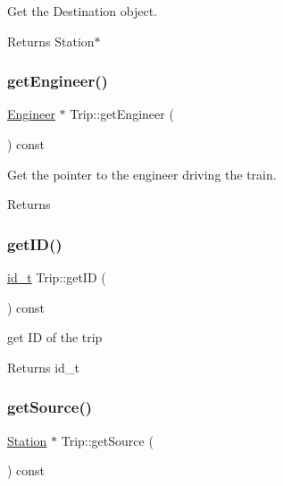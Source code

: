 Get the Destination object. 

\begin{DoxyReturn}{Returns}
Station$\ast$ 
\end{DoxyReturn}
\mbox{\label{classTrip_ae499f5d9d3c72fecfac96c4a46cb5d28}} 
\subsubsection{\texorpdfstring{get\+Engineer()}{getEngineer()}}
{\footnotesize\ttfamily \mbox{\hyperlink{classEngineer}{Engineer}} $\ast$ Trip\+::get\+Engineer (\begin{DoxyParamCaption}{ }\end{DoxyParamCaption}) const}

Get the pointer to the engineer driving the train.

\begin{DoxyReturn}{Returns}

\end{DoxyReturn}
\mbox{\label{classTrip_a7770a61e1211789c80b003eeedcaa09c}} 
\subsubsection{\texorpdfstring{get\+I\+D()}{getID()}}
{\footnotesize\ttfamily \mbox{\hyperlink{project__utils_8h_a8f3a969054ad2200720b96e7e23dd4e1}{id\+\_\+t}} Trip\+::get\+ID (\begin{DoxyParamCaption}{ }\end{DoxyParamCaption}) const}



get ID of the trip 

\begin{DoxyReturn}{Returns}
id\+\_\+t 
\end{DoxyReturn}
\mbox{\label{classTrip_a65b45d4816c85d47ef743e7c1cfe807f}} 
\subsubsection{\texorpdfstring{get\+Source()}{getSource()}}
{\footnotesize\ttfamily \mbox{\hyperlink{classStation}{Station}} $\ast$ Trip\+::get\+Source (\begin{DoxyParamCaption}{ }\end{DoxyParamCaption}) const}



